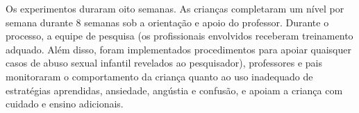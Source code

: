 




Os experimentos duraram oito semanas. As crianças completaram um nível por semana durante 8 semanas sob a orientação e apoio do professor. Durante o processo, a equipe de pesquisa (os profissionais envolvidos receberam treinamento adquado. Além disso, foram implementados procedimentos para apoiar quaisquer casos de abuso sexual infantil revelados ao pesquisador), professores e pais monitoraram o comportamento da criança quanto ao uso inadequado de estratégias aprendidas, ansiedade, angústia e confusão, e apoiam a criança com cuidado e ensino adicionais.

